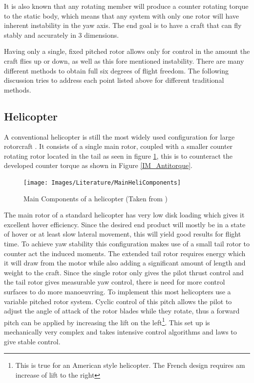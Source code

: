 It is also known that any rotating member will produce a counter rotating torque to the static body, which means that any system with only one rotor will have inherent instability in the yaw axis. The end goal is to have a craft that can fly stably and accurately in 3 dimensions.

Having only a single, fixed pitched rotor allows only for control in the amount the craft flies up or down, as well as this fore mentioned instability. There are many different methods to obtain full six degrees of flight freedom. The following discussion tries to address each point listed above for different traditional methods.


\subsection{Helicopter}
A conventional helicopter is still the most widely used configuration for large rotorcraft \cite{RotorConfig}. It consists of a single main rotor, coupled with a smaller counter rotating rotor located in the tail as seen in figure \ref{IM_Helicopter}, this is to counteract the developed counter torque as shown in Figure \ref{IM_Antitorque}.

\begin{figure}[H]
	\centering
	\texttt{[image: Images/Literature/MainHeliComponents]}     
	\caption{Main Components of a helicopter (Taken from \cite{Heli})}
	\label{IM_Helicopter}
\end{figure}

The main rotor of a standard helicopter has very low disk loading which gives it excellent hover efficiency. Since the desired end product will mostly be in a state of hover or at least slow lateral movement, this will yield good results for flight time. To achieve yaw stability this configuration makes use of a small tail rotor to counter act the induced moments. The extended tail rotor requires energy which it will draw from the motor while also adding a significant amount of length and weight to the craft. Since the single rotor only gives the pilot thrust control and the tail rotor gives measurable yaw control, there is need for more control surfaces to do more manoeuvring. To implement this most helicopters use a variable pitched rotor system. Cyclic control of this pitch allows the pilot to adjust the angle of attack of the rotor blades while they rotate, thus a forward pitch can be applied by increasing the lift on the left\footnote{This is true for an American style helicopter. The French design requires am increase of lift to the right}. This set up is mechanically very complex and takes intensive control algorithms and laws to give stable control.

